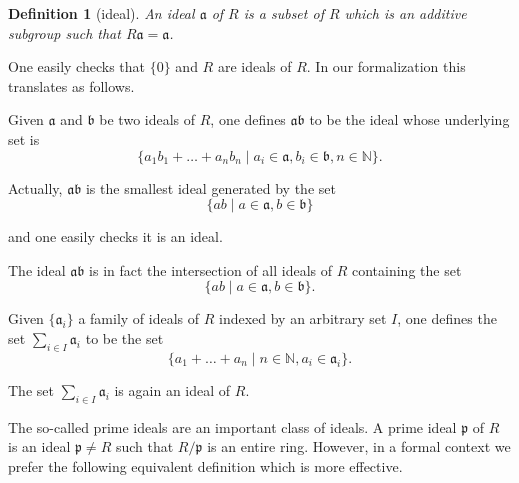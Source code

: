 \documentclass[12pt]{scrartcl}
\newtheorem{definition}[proposition]{Definition}
\begin{document}
\begin{definition}[ideal]
	An ideal $\mathfrak{a}$ of $R$ is a subset of $R$ which is an additive subgroup such that $R\mathfrak{a} = \mathfrak{a}$.
\end{definition}


One easily checks that $\lbrace 0 \rbrace$ and $R$ are ideals of $R$. In our formalization this translates as follows.



Given $\mathfrak{a}$ and $\mathfrak{b}$ be two ideals of $R$, one defines $\mathfrak{a} \mathfrak{b}$ to be the ideal whose underlying set is 
\[
	\lbrace a_1 b_1 + \dots + a_n b_n \mid a_i \in \mathfrak{a}, b_i \in \mathfrak{b}, n \in \mathbb{N} \rbrace.
\]

Actually, $\mathfrak{a} \mathfrak{b}$ is the smallest ideal generated by the set 
	\[
	\lbrace a b \mid a \in \mathfrak{a}, b \in \mathfrak{b} \rbrace
	\]
	

and one easily checks it is an ideal.


The ideal $\mathfrak{a} \mathfrak{b}$ is in fact the intersection of all ideals of $R$ containing the set
	\[
	\lbrace a b \mid a \in \mathfrak{a}, b \in \mathfrak{b} \rbrace .
	\]
	

Given $\lbrace \mathfrak{a}_i \rbrace$ a family of ideals of $R$ indexed by an arbitrary set $I$, one defines the set $\displaystyle \sum_{i \in I} \mathfrak{a}_i$ to be the set 
	\[
	\lbrace a_1 + \dots + a_n \mid n \in \mathbb{N}, a_i \in \mathfrak{a}_i \rbrace .
	\]

The set $\displaystyle \sum_{i \in I} \mathfrak{a}_i$ is again an ideal of $R$.	


The so-called prime ideals are an important class of ideals. A prime ideal $\mathfrak{p}$ of $R$ is an ideal $\mathfrak{p} \neq R$ such that $R/\mathfrak{p}$ is an entire ring. However, in a formal context we prefer the following equivalent definition which is more effective.
\end{document}
